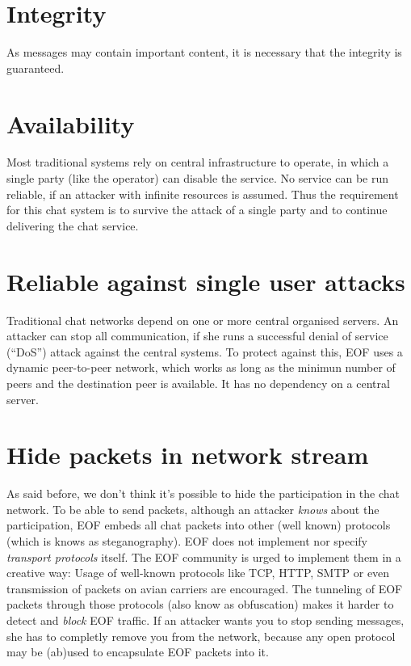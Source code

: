 % 
\section{Integrity}
As messages may contain important content, it is necessary that the integrity
is guaranteed.
\section{Availability}
Most traditional systems rely on central infrastructure to operate, in which a
single party (like the operator) can disable the service. 
No service can be run reliable, if an attacker with infinite resources is assumed.
Thus the requirement for this chat system is to survive the attack of a single
party and to continue delivering the chat service.
\section{Reliable against single user attacks}
Traditional chat networks depend on one or more central organised servers.
An attacker can stop all communication, if she runs a successful denial
of service ("`DoS"') attack against the central systems.
To protect against this, EOF uses a dynamic peer-to-peer network, which works
as long as the minimun number of peers and the destination peer is available.
It has no dependency on a central server.
\section{Hide packets in network stream}
As said before, we don't think it's possible to hide the participation in the
chat network. To be able to send packets, although an attacker \emph{knows}
about the participation, EOF embeds all chat packets into other (well known)
protocols (which is knows as steganography\cite{stegano-1}).
EOF does not implement nor specify \emph{transport protocols} itself.
The EOF community is urged to implement them in a creative way: Usage
of well-known protocols like TCP\cite{tcp-1}, HTTP\cite{http-1},
SMTP\cite{smtp-1} or even transmission of packets on avian
carriers\cite{avian-1} are encouraged. The tunneling of EOF packets through
those protocols (also know as obfuscation) makes it harder to detect
and \emph{block} EOF traffic.
If an attacker wants you to stop sending messages, she has to completly
remove you from the network, because any open protocol may be (ab)used to
encapsulate EOF packets into it.
